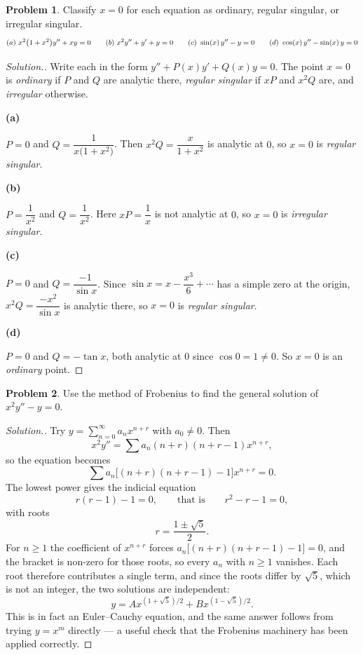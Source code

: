 \documentclass[11pt,a4paper]{article}
\theoremstyle{definition}
\newtheorem{problemx}{Problem}[subsection]
\newenvironment{problem}{\begin{problemx}}{\end{problemx}}
\newenvironment{solution}
  {\renewcommand{\qedsymbol}{}\begin{proof}[\textit{Solution}.]}
  {\end{proof}}
\newcommand{\subhead}[1]{%
  \par\medskip\noindent\textbf{#1}\par\nobreak\smallskip}
\begin{document}
\begin{problem}
Classify $x=0$ for each equation as ordinary, regular singular, or irregular
singular.
$$(a)\ x^2\big(1+x^2\big)y''+xy = 0\hspace{0.7cm}
(b)\ x^2y''+y'+y = 0\hspace{0.7cm}
(c)\ \sin(x)\,y''-y = 0\hspace{0.7cm}
(d)\ \cos(x)\,y''-\sin(x)\,y = 0$$
\end{problem}
\begin{solution}
Write each in the form $y''+P(x)y'+Q(x)y = 0$. The point $x=0$ is
\emph{ordinary} if $P$ and $Q$ are analytic there, \emph{regular singular} if
$xP$ and $x^2Q$ are, and \emph{irregular} otherwise.

\subhead{(a)}
$P = 0$ and $Q = \dfrac{1}{x\big(1+x^2\big)}$. Then $x^2Q = \dfrac{x}{1+x^2}$
is analytic at $0$, so $x=0$ is \emph{regular singular}.

\subhead{(b)}
$P = \dfrac{1}{x^2}$ and $Q = \dfrac{1}{x^2}$. Here $xP = \dfrac1x$ is not
analytic at $0$, so $x=0$ is \emph{irregular singular}.

\subhead{(c)}
$P = 0$ and $Q = \dfrac{-1}{\sin x}$. Since $\sin x = x - \dfrac{x^3}{6}+\cdots$
has a simple zero at the origin, $x^2Q = \dfrac{-x^2}{\sin x}$ is analytic
there, so $x=0$ is \emph{regular singular}.

\subhead{(d)}
$P = 0$ and $Q = -\tan x$, both analytic at $0$ since $\cos 0 = 1\neq 0$. So
$x=0$ is an \emph{ordinary} point.
\end{solution}

\begin{problem}
Use the method of Frobenius to find the general solution of
$x^2y''-y = 0$.
\end{problem}
\begin{solution}
Try $y = \displaystyle\sum_{n=0}^{\infty}a_nx^{n+r}$ with $a_0\neq 0$. Then
$$x^2y'' = \sum a_n(n+r)(n+r-1)x^{n+r},$$
so the equation becomes
$$\sum a_n\Big[(n+r)(n+r-1) - 1\Big]x^{n+r} = 0 .$$
The lowest power gives the indicial equation
$$r(r-1)-1 = 0,\qquad\text{that is}\qquad r^2-r-1 = 0 ,$$
with roots
$$r = \frac{1\pm\sqrt5}{2}.$$
For $n\geq 1$ the coefficient of $x^{n+r}$ forces
$a_n\big[(n+r)(n+r-1)-1\big] = 0$, and the bracket is non-zero for those roots,
so every $a_n$ with $n\geq 1$ vanishes. Each root therefore contributes a single
term, and since the roots differ by $\sqrt5$, which is not an integer, the two
solutions are independent:
$$y = Ax^{(1+\sqrt5)/2} + Bx^{(1-\sqrt5)/2}.$$
This is in fact an Euler--Cauchy equation, and the same answer follows from
trying $y = x^m$ directly --- a useful check that the Frobenius machinery has
been applied correctly.
\end{solution}
\end{document}
